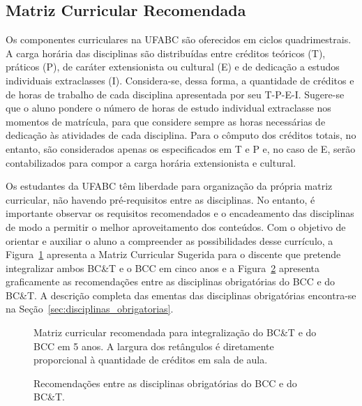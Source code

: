 \subsection{Matriz Curricular Recomendada}
\label{sec:matriz_curricular}

Os componentes curriculares na UFABC são oferecidos em ciclos quadrimestrais.
A carga horária das disciplinas são distribuídas entre créditos teóricos (T),
práticos (P), de caráter extensionista ou cultural (E) e de dedicação a estudos
individuais extraclasses (I).
Considera-se, dessa forma, a quantidade de créditos e de horas de trabalho de
cada disciplina apresentada por seu T-P-E-I.
Sugere-se que o aluno pondere o número de horas de estudo individual
extraclasse nos momentos de matrícula, para que considere sempre as horas
necessárias de dedicação às atividades de cada disciplina. 
Para o cômputo dos créditos totais, no entanto, são considerados apenas os
especificados em T e P e, no caso de E, serão contabilizados para compor a
carga horária extensionista e cultural.


Os estudantes da UFABC têm liberdade para organização da própria matriz
curricular, não havendo pré-requisitos entre as disciplinas.
No entanto, é importante observar os requisitos recomendados e o encadeamento
das disciplinas de modo a permitir o melhor aproveitamento dos conteúdos.
Com o objetivo de orientar e auxiliar o aluno a compreender as possibilidades desse
currículo, a Figura~\ref{fig:matriz_curricular} apresenta a Matriz Curricular
Sugerida para o discente que pretende integralizar ambos BC\&T e o BCC em cinco
anos e a Figura~\ref{fig:recomendacoes} apresenta graficamente as recomendações
entre as disciplinas obrigatórias do BCC e do BC\&T.
A descrição completa das ementas das disciplinas obrigatórias encontra-se na
Seção~\ref{sec:disciplinas_obrigatorias}.

\begin{figure}
    \centering
    \resizebox{\textwidth}{!}{}
    \caption{Matriz curricular recomendada para integralização do BC\&T e do
    BCC em 5 anos. A largura dos retângulos é diretamente proporcional à
    quantidade de créditos em sala de aula.}
    \label{fig:matriz_curricular}
\end{figure}

\begin{figure}
    \centering
    \resizebox{\textwidth}{!}{}
    \caption{Recomendações entre as disciplinas obrigatórias do BCC e do BC\&T.}
    \label{fig:recomendacoes}
\end{figure}

